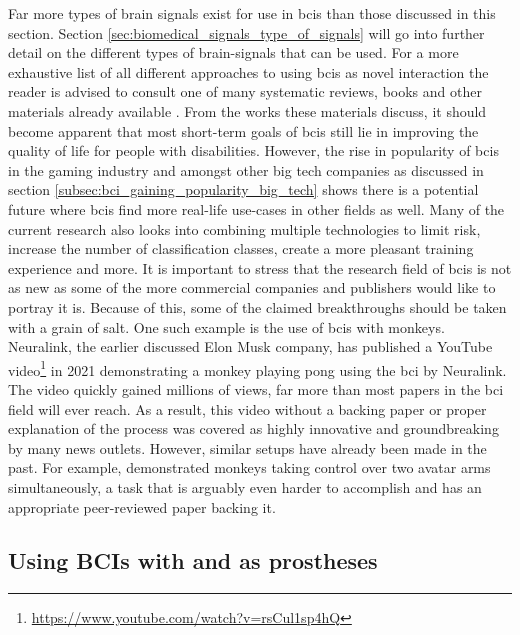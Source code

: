 Far more types of brain signals exist for use in \glspl{bci} than those discussed in this section.
Section \ref{sec:biomedical_signals_type_of_signals} will go into further detail on the different types of brain-signals that can be used.
For a more exhaustive list of all different approaches to using \glspl{bci} as novel interaction the reader is advised to consult one of many systematic reviews, books and other materials already available \citep{bci_review_book_chapter, bci_review, bci_in_medicine, bci_history, bci_review_monkey, bci_handbook}.
From the works these materials discuss, it should become apparent that most short-term goals of \glspl{bci} still lie in improving the quality of life for people with disabilities.
However, the rise in popularity of \glspl{bci} in the gaming industry and amongst other big tech companies as discussed in section \ref{subsec:bci_gaining_popularity_big_tech} shows there is a potential future where \glspl{bci} find more real-life use-cases in other fields as well.
Many of the current research also looks into combining multiple technologies to limit risk, increase the number of classification classes, create a more pleasant training experience and more.
It is important to stress that the research field of \glspl{bci} is not as new as some of the more commercial companies and publishers would like to portray it is.
Because of this, some of the claimed breakthroughs should be taken with a grain of salt.
One such example is the use of \glspl{bci} with monkeys.
Neuralink, the earlier discussed Elon Musk company, has published a YouTube video\footnote{\url{https://www.youtube.com/watch?v=rsCul1sp4hQ}} in 2021 demonstrating a monkey playing pong using the \gls{bci} by Neuralink.
The video quickly gained millions of views, far more than most papers in the \gls{bci} field will ever reach.
As a result, this video without a backing paper or proper explanation of the process was covered as highly innovative and groundbreaking by many news outlets.
However, similar setups have already been made in the past.
For example, \citet{bci_monkey_arms} demonstrated monkeys taking control over two avatar arms simultaneously, a task that is arguably even harder to accomplish and has an appropriate peer-reviewed paper backing it.



\subsection{Using BCIs with and as prostheses}
\label{subsec:bci_helping_disabled_prostheses}


